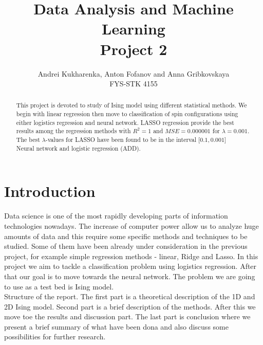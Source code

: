 \documentclass[10pt]{article}
\begin{document}
\setlength\parindent{1pt}
\title{Data Analysis and Machine Learning \\
	Project 2\\ }
\author{Andrei Kukharenka, Anton Fofanov and Anna Gribkovskaya \\  
	FYS-STK 4155 
}
\date{}

\maketitle

\begin{abstract}
	This project is devoted to study of Ising model using different statistical methods. We begin with linear regression then move to classification of spin configurations using either logistics regression and neural network. LASSO regression provide the best results among the regression methods with $R^2=1$ and $MSE=\num{0.000001}$ for $\lambda=\num{0.001}$. The best $\lambda$-values for LASSO have been found to be in the interval $\lbrack \num{0.1} , \num{0.001} \rbrack$\\
	Neural network and logistic regression (ADD).
\end{abstract}
\newpage
\tableofcontents
\section{Introduction}

Data science is one of the most rapidly developing parts of information technologies nowadays. The increase of computer power allow us to analyze huge amounts of data and this require some specific methods and techniques to be studied. Some of them have been already under consideration in the previous project, for example simple regression methods - linear, Ridge and Lasso. In this project we aim to tackle a classification problem using logistics regression. After that our goal is to move towards the neural network. The problem we are going to use as a test bed is Ising model. \\

Structure of the report. The first part is a theoretical description of the 1D and 2D Ising model. Second part is a brief description of the methods. After this we move toe the results and discussion part. The last part is conclusion where we present a brief summary of what have been dona and also discuss some possibilities for further research.
\end{document}
